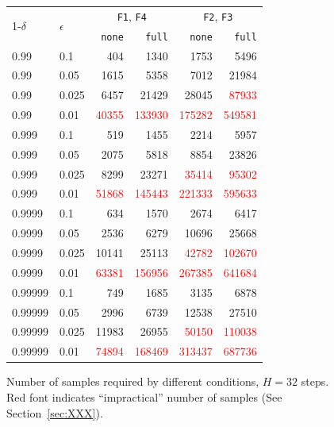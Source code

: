 \documentclass{article}
\begin{document}
\begin{figure}[t!]
%
%
\scriptsize
\centering
\begin{tabular}{ll|rr|rr}
\hline
\multirow{2}{*}{1-$\delta$} &
\multirow{2}{*}{ $\epsilon$} & 
\multicolumn{2}{c|}{\texttt{F1}, \texttt{F4}} &
\multicolumn{2}{c}{\texttt{F2}, \texttt{F3}} \\
 & & \texttt{none} & \texttt{full} &  
 \texttt{none} & \texttt{full}  \\
\hline
0.99 & 0.1 & 404 & 1340 & 1753 & 5496 \\
0.99 & 0.05 & 1615 & 5358 & 7012 & 21984 \\
0.99 & 0.025 & 6457 & 21429 & 28045 & \textcolor{red}{87933} \\
0.99 & 0.01 & \textcolor{red}{40355} & \textcolor{red}{133930} & \textcolor{red}{175282} & \textcolor{red}{549581} \\
\hline
0.999 & 0.1 & 519 & 1455 & 2214 & 5957 \\
0.999 & 0.05 & 2075 & 5818 & 8854 & 23826 \\
0.999 & 0.025 & 8299 & 23271 & \textcolor{red}{35414} & \textcolor{red}{95302} \\
0.999 & 0.01 & \textcolor{red}{51868} & \textcolor{red}{145443} & \textcolor{red}{221333} & \textcolor{red}{595633} \\
\hline
0.9999 & 0.1 & 634 & 1570 & 2674 & 6417 \\
0.9999 & 0.05 & 2536 & 6279 & 10696 & 25668 \\
0.9999 & 0.025 & 10141 & 25113 & \textcolor{red}{42782} & \textcolor{red}{102670} \\
0.9999 & 0.01 & \textcolor{red}{63381} & \textcolor{red}{156956} & \textcolor{red}{267385} & \textcolor{red}{641684} \\
\hline
0.99999 & 0.1 & 749 & 1685 & 3135 & 6878 \\
0.99999 & 0.05 & 2996 & 6739 & 12538 & 27510 \\
0.99999 & 0.025 & 11983 & 26955 & \textcolor{red}{50150} & \textcolor{red}{110038} \\
0.99999 & 0.01 & \textcolor{red}{74894} & \textcolor{red}{168469} & \textcolor{red}{313437} & \textcolor{red}{687736} \\
\hline
\end{tabular}
\caption{Number of samples required by different conditions, $H=32$ steps. Red font indicates ``impractical'' number of samples (See Section~\ref{sec:XXX}).}
\label{fig:naive}
\end{figure}
\end{document}
